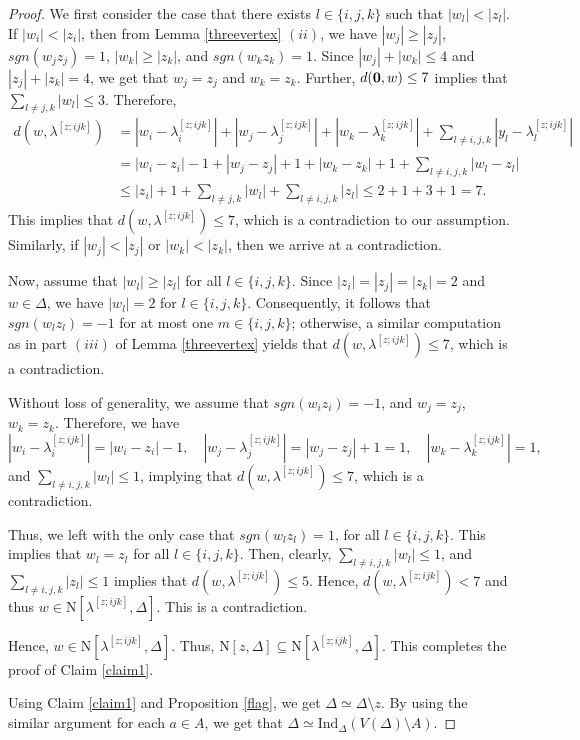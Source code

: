 \documentclass{amsart}
\theoremstyle{definition}
\theoremstyle{remark}
\numberwithin{equation}{section}
\newcommand{\D}{\Delta}
\def\n{{\mathrm{N}}}
\begin{document}
\begin{proof}
	We first consider the case that there exists $l \in \{i, j, k\}$ such that  $|w_l| < |z_l|$. If  $|w_i| < |z_i|$, then from Lemma \ref{threevertex} $(ii)$, we have $|w_j| \geq |z_j|$, $sgn(w_jz_j)=1$, $|w_k| \geq |z_k|$,  and $sgn(w_kz_k)=1$. Since $|w_j| + |w_k| \leq 4$  and $|z_j|+|z_k|=4$, we get that $w_j = z_j$ and $w_k = z_k$.  Further, $d({\bf{0}}, w) \leq 7$ implies that  $\sum_{l \neq j,k} |w_l| \leq 3$. Therefore,
	\begin{align*}
		d(w, \lambda^{[z;ijk]}) &= |w_i - \lambda^{[z;ijk]}_i| + |w_j - \lambda^{[z;ijk]}_j| + |w_k - \lambda^{[z;ijk]}_k| + \sum_{l \neq i,j,k} |y_l - \lambda^{[z;ijk]}_l| \\
		&= |w_i - z_i| - 1 + |w_j - z_j| + 1 + |w_k - z_k| + 1 + \sum_{l \neq i,j,k} |w_l - z_l| \\
		&\leq |z_i| + 1 + \sum_{l \neq j,k} |w_l| + \sum_{l \neq i,j,k} |z_l|\leq 2 + 1 + 3 + 1 = 7.
	\end{align*}
	This implies that $d(w,\lambda^{[z;ijk]})\leq 7$, which is a contradiction to our assumption. Similarly, if $|w_j| < |z_j|$ or $|w_k| < |z_k|$, then we arrive at a contradiction.
	
	Now, assume that $|w_l| \geq |z_l|$ for all $l \in \{i, j, k\}$. Since $|z_i|=|z_j|=|z_k|=2$ and $w \in \Delta$, we have $|w_l| = 2$ for $l \in \{i, j, k\}$. Consequently, it follows that $sgn(w_lz_l)=-1$ for at most one $m \in \{i, j, k\}$; otherwise, a similar computation as in part $(iii)$ of Lemma \ref{threevertex} yields that $d(w, \lambda^{[z;ijk]}) \leq 7$, which is a contradiction. 
	
	
	Without loss of generality, we assume that $sgn(w_iz_i)=-1$, and $w_j = z_j$, $w_k = z_k$. Therefore, we have $|w_i - \lambda^{[z;ijk]}_i| = |w_i - z_i| - 1, \quad |w_j - \lambda^{[z;ijk]}_j| = |w_j - z_j| + 1 = 1, \quad |w_k - \lambda^{[z;ijk]}_k| = 1,$ and $\sum_{l \neq i,j,k} |w_l| \leq 1$, implying that $d(w, \lambda^{[z;ijk]}) \leq 7$, which is a contradiction.
	
	Thus, we left with the only case that  $sgn(w_lz_l)=1$, for all $l \in \{i, j, k\}$. This implies that $w_l = z_l$ for all $l \in \{i, j, k\}$.
	Then, clearly,  $\sum_{l \neq i,j,k} |w_l|  \leq 1$, and $\sum_{l \neq i,j,k} |z_l|  \leq 1$ implies that $d(w, \lambda^{[z;ijk]}) \leq 5$.   Hence, $d(w,\lambda^{[z;ijk]})< 7$ and thus $w\in \n[\lambda^{[z;ijk]},\D]$. This is a contradiction.
	
	Hence, $w\in \n[\lambda^{[z;ijk]},\D]$. Thus, $\n[z,\D]\subseteq \n[\lambda^{[z;ijk]},\D]$. This completes the proof of Claim \ref{claim1}.
	
	
	Using Claim \ref{claim1} and  Proposition \ref{flag},  we get $\D\simeq \D \setminus z$. By using the similar argument  for each $a\in A$, we get that $\D\simeq \mathrm{Ind}_{\D}(V(\D)\setminus A)$.
\end{proof}
\end{document}
